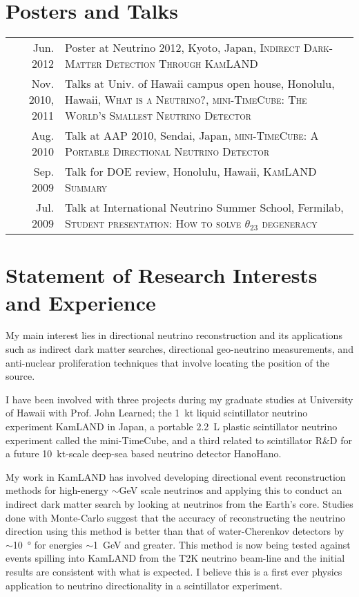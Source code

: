 \documentclass[a4paper,10pt]{article} %
\begin{document}
\section{Posters and Talks}
\begin{tabular}{rp{11cm}}
	Jun. 2012 & Poster at Neutrino 2012, Kyoto, Japan, \textsc{Indirect
	Dark-Matter Detection Through KamLAND}\\
	Nov. 2010, 2011 & Talks at Univ. of Hawaii campus open house, Honolulu,
	Hawaii, \textsc{What is a Neutrino?}, \textsc{mini-TimeCube: The World's
		Smallest Neutrino Detector}\\
	Aug. 2010 & Talk at AAP 2010, Sendai, Japan, \textsc{mini-TimeCube: A
	Portable Directional Neutrino Detector}\\
	Sep. 2009 & Talk for DOE review, Honolulu, Hawaii, \textsc{KamLAND
Summary}\\
	Jul. 2009 & Talk at International Neutrino Summer School, Fermilab,
\textsc{Student presentation: How to solve $\theta_{23}$ degeneracy}\\
	
\end{tabular}


\section{Statement of Research Interests and Experience}
My main interest lies in directional neutrino reconstruction and its
applications such as indirect dark matter searches, directional geo-neutrino
measurements, and anti-nuclear proliferation techniques that involve locating
the position of the source.

I have been involved with three projects during my graduate studies at
University of Hawaii with Prof. John Learned; the \SI{1}{\kilo\tonne} liquid
scintillator neutrino experiment KamLAND in Japan, a portable
\SI{2.2}{\liter} plastic scintillator neutrino experiment called the
mini-TimeCube, and a third related to scintillator R\&D for a
future \SI{10}{\kilo\tonne}-scale deep-sea based neutrino detector HanoHano.

My work in KamLAND has involved developing directional event reconstruction
methods for high-energy $\sim$\si{\giga\electronvolt} scale neutrinos and
applying this to conduct an indirect dark matter search by looking at neutrinos
from the Earth's core.
Studies done with Monte-Carlo suggest that the accuracy of reconstructing the
neutrino direction using this method is better than that of water-Cherenkov
detectors by $\sim$\SI{10}{\degree} for energies
$\sim$\SI{1}{\giga\electronvolt} and greater.
This method is now being tested against events spilling into KamLAND from the
T2K neutrino beam-line and the initial results are consistent with what is
expected.
I believe this is a first ever physics application to neutrino directionality in
a scintillator experiment.
\end{document}
